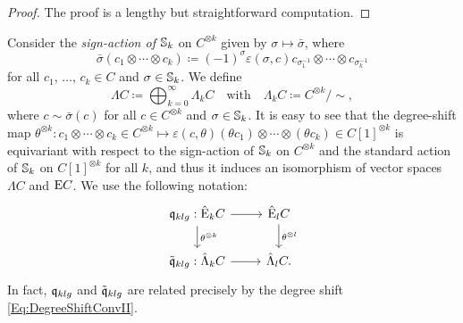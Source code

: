 \documentclass[\MainFolder/Text.tex]{subfiles}
\begin{document}
\begin{proof}
The proof is a lengthy but straightforward computation.
\end{proof}

Consider the \emph{sign-action of $\mathbb{S}_k$} on $C^{\otimes k}$ given by $\sigma \mapsto \bar{\sigma}$, where 
\[ \bar{\sigma}(c_1\otimes\dotsb\otimes c_k)\coloneqq(-1)^\sigma\varepsilon(\sigma,c)c_{\sigma_1^{-1}}\otimes\dotsb\otimes c_{\sigma_k^{-1}} \]
for all $c_1$, $\dotsc$, $c_k\in C$ and $\sigma\in \mathbb{S}_k$. We define 
\[ \Lambda C \coloneqq \bigoplus_{k=0}^\infty \Lambda_k C\quad\text{with}\quad \Lambda_k C \coloneqq C^{\otimes k}/\sim, \]
where $c\sim \bar{\sigma}(c)$ for all $c\in C^{\otimes k}$ and $\sigma\in \mathbb{S}_k$. It is easy to see that the degree-shift map $\theta^{\otimes k}: c_1\otimes \dotsb \otimes c_k \in C^{\otimes k} \mapsto \varepsilon(c,\theta)(\theta c_1)\otimes\dotsb\otimes(\theta c_k)\in C[1]^{\otimes k}$ is equivariant with respect to the sign-action of $\mathbb{S}_k$ on $C^{\otimes k}$ and the standard action of $\mathbb{S}_k$ on $C[1]^{\otimes k}$ for all $k$, and thus it induces an isomorphism of vector spaces $\Lambda C$ and $\mathrm{E} C$. We use the following notation:
\[\begin{tikzcd}
 \OPQ_{klg}: \hat{\Ext}_k C \arrow{r} \arrow{d}{\theta^{\otimes k}} & \hat{\Ext}_l C \arrow{d}{\theta^{\otimes l}} \\
 \tilde{\OPQ}_{klg}: \hat{\Lambda}_k C \arrow{r} & \hat{\Lambda}_l C.
\end{tikzcd}\]
In fact, $\mathfrak{q}_{klg}$ and $\tilde{\mathfrak{q}}_{klg}$ are related precisely by the degree shift \eqref{Eq:DegreeShiftConvII}. 
\end{document}
